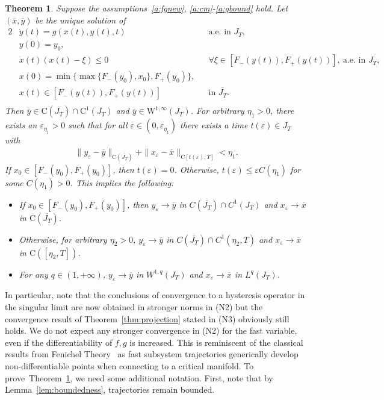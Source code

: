 \documentclass[12pt]{article}
\newtheorem{thm}{Theorem}[section]
\def\I{\infty}
\def\ra{\rightarrow}
\def\I{\infty}
\begin{document}
\begin{thm}
\label{Thm:approimation}
Suppose the assumptions~\ref{a:fgnew}, \ref{a:cm}-\ref{a:gbound} hold.
Let $(\overline{x}, \overline{y})$ be the unique solution of
\begin{alignat}{2}
&\dot{y}(t) = g(x(t),y(t),t)\ && \text{a.e. in } J_T,
\label{Eq:evol_with_time_x_1}\\
& y(0) = y_0,\label{Eq:evol_with_time_x_2}\\
&\dot{x}(t)(x(t)-\xi) \leq 0 && \forall\xi\in [F_-(y(t)), F_+(y(t))],
\ \text{a.e. in } J_T,\label{Eq:evol_with_time_y_1}\\
&x(0) =\min\{\max\{F_-(y_0),x_0\},F_+(y_0)\},\label{Eq:evol_with_time_y_2}\\
&x(t)\in [F_-(y(t)), F_+(y(t))] && 
\text{in }\overline{J_T}.\label{Eq:evol_with_time_y_3}\\
\end{alignat}
Then $\overline{y}\in \mathrm{C}(\overline{J_T})\cap\mathrm{C}^1(J_T)$ 
and $\overline{y}\in \mathrm{W}^{1,\infty}(J_T)$. For arbitrary $\eta_1>0$, 
there exists an $\varepsilon_{\eta_1}>0$ such that for all 
$\varepsilon\in (0,\varepsilon_{\eta_1})$ there exists a time 
$t(\varepsilon)\in J_T$ with
\begin{align}
\|y_{\varepsilon} - \overline{y}\|_{\mathrm{C}(\overline{J_T})} 
+ \|x_{\varepsilon} - \overline{x}\|_{ \mathrm{C}[t(\varepsilon),T] } 
<\eta_1.\label{convergence_yeps_hyst}
\end{align}
If $x_0\in [F_-(y_0),F_+(y_0)]$, then $t(\varepsilon)=0$. Otherwise, 
$t(\varepsilon) \leq \varepsilon C(\eta_1)$ for some $C(\eta_1)>0$.
This implies the following:
\begin{itemize}	
	\item[(N1)] If $x_0\in [F_-(y_0),F_+(y_0)]$, then $y_{\varepsilon} 
	\rightarrow \overline{y}$ in $C(\overline{J_T})\cap C^1(J_T)$ 
	and $x_\varepsilon \rightarrow \overline{x}$ in 
	$\mathrm{C}(\overline{J_T})$.	
	\item[(N2)] Otherwise, for arbitrary $\eta_2>0$, $y_{\varepsilon} \rightarrow 
	\overline{y}$ in $C(\overline{J_T})\cap C^1(\eta_2,T)$ and $x_\varepsilon 
	\rightarrow \overline{x}$ in $\mathrm{C}([\eta_2,T])$.
	\item[(N3)] For any $q\in(1,+\I)$, $y_\varepsilon\ra \overline{y}$ in 
	$W^{1,q}(J_T)$ and $x_\varepsilon\ra \overline{x}$ in $L^q(J_T)$.
\end{itemize}
\end{thm} 

In particular, note that the conclusions of convergence to a hysteresis operator
in the singular limit are now obtained in stronger norms in (N2) but the convergence 
result of Theorem~\ref{thm:projection} stated in (N3) obviously still holds. We do not expect
any stronger convergence in (N2) for the fast variable, even if the differentiability 
of $f,g$ is increased. This is reminiscent of the classical results from Fenichel
Theory~\cite{Fenichel4,Jones,KuehnBook} as fast subsystem trajectories 
generically develop non-differentiable points when connecting to a critical 
manifold. To prove~Theorem~\ref{Thm:approimation}, we need some additional
notation. First, note that by Lemma~\ref{lem:boundedness}, trajectories remain 
bounded.
\end{document}
